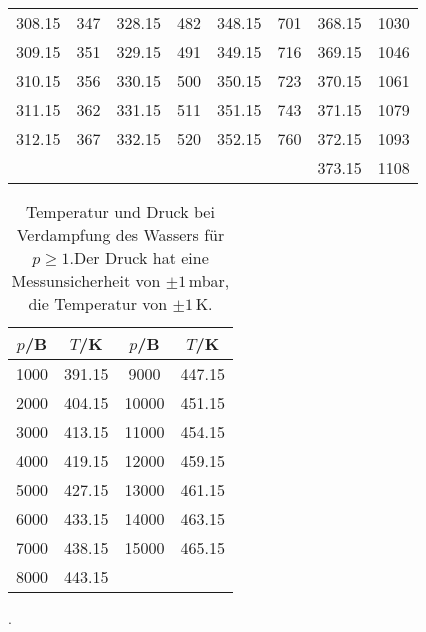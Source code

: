 \begin{table}[H]
\begin{tabular}{
    c c||c c||c c||c c
  }
  308.15  & 347  & 328.15  & 482  & 348.15  & 701  & 368.15  & 1030\\
  309.15  & 351  & 329.15  & 491  & 349.15  & 716  & 369.15  & 1046\\
  310.15  & 356  & 330.15  & 500  & 350.15  & 723  & 370.15  & 1061\\
  311.15  & 362  & 331.15  & 511  & 351.15  & 743  & 371.15  & 1079\\
  312.15  & 367  & 332.15  & 520  & 352.15  & 760  & 372.15  & 1093\\
        &   &       &       &       &      & 373.15  & 1108 \\
  \bottomrule
  \end{tabular}
  \end{table}
  \begin{table}[H]
    \centering
    \caption{Temperatur und Druck bei Verdampfung des Wassers für $p\geq 1$.Der Druck hat eine Messunsicherheit von
    $\pm1$\,mbar, die Temperatur von $\pm 1$\,K.}
    \label{tab:Messreihe_2}
  \begin{tabular}{
    c c||c c
  }
  \toprule 
  $p$/B & $T$/K & $p$/B & $T$/K\\
  \midrule
  1000  & 391.15 & 9000  & 447.15\\
  2000  & 404.15 & 10000 & 451.15\\
  3000  & 413.15 & 11000 & 454.15\\
  4000  & 419.15 & 12000 & 459.15\\
  5000  & 427.15 & 13000 & 461.15\\
  6000  & 433.15 & 14000 & 463.15\\
  7000  & 438.15 & 15000 & 465.15\\
  8000  & 443.15 &       &      \\
  \bottomrule
  \end{tabular}
  \end{table}
  .